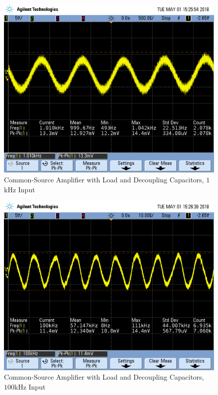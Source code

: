 \begin{figure}[h!]
	\centering
	\includegraphics[scale=0.45]{./images/SCOPE_13.PNG}
	\caption{Common-Source Amplifier with Load and Decoupling Capacitors, $1$\si{\kilo\hertz} Input}
	\label{fig:SCOPE_13}
\end{figure}

\FloatBarrier


\FloatBarrier

\begin{figure}[h!]
	\centering
	\includegraphics[scale=0.45]{./images/SCOPE_14.PNG}
	\caption{Common-Source Amplifier with Load and Decoupling Capacitors, $100$\si{\kilo\hertz} Input}
	\label{fig:SCOPE_14}
\end{figure}

